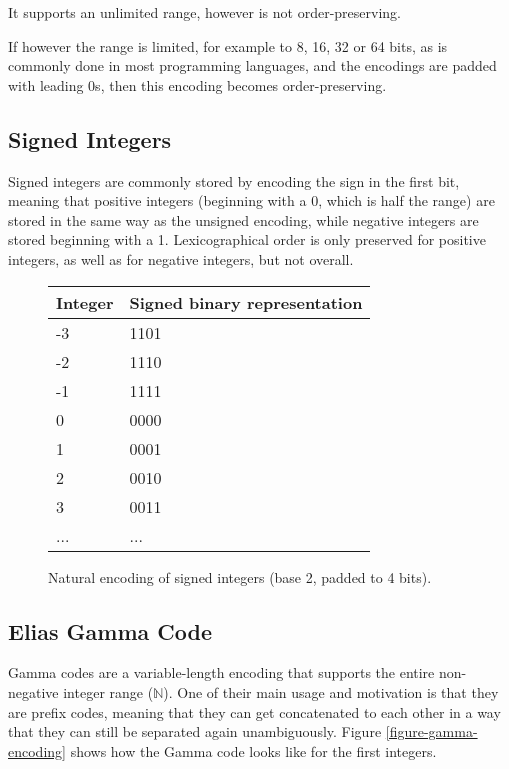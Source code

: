 \documentclass{acm_proc_article-sp}
\begin{document}
It supports an unlimited range, however is not order-preser\-ving.

If however the range is limited, for example to 8, 16, 32 or 64 bits, as is commonly done in most programming languages, and the encodings are padded with leading 0s, then this encoding becomes order-preserving.

\subsection{Signed Integers}

Signed integers are commonly stored by encoding the sign in the first bit, meaning that positive integers (beginning with a 0, which is half the range) are stored in the same way as the unsigned encoding, while negative integers are stored beginning with a 1. Lexicographical order is only preserved for positive integers, as well as for negative integers, but not overall.

\begin{figure}
\caption{Natural encoding of signed integers (base 2, padded to 4 bits).}
\label{figure-natural-signed-encoding}
\center
\begin{tabular}{|l|l|}
\hline
Integer & Signed binary representation \\
\hline
-3 & 1101 \\
\hline
-2 & 1110 \\
\hline
-1 & 1111 \\
\hline
0 & 0000 \\
\hline
1 & 0001 \\
\hline
2 & 0010 \\
\hline
3 & 0011 \\
\hline
... & ... \\
\hline
\end{tabular}
\end{figure}

\subsection{Elias Gamma Code}
\label{section-gamma-code}

Gamma codes are a variable-length encoding that supports the entire non-negative integer range ($\mathbb{N}$). One of their main usage and motivation is that they are prefix codes, meaning that they can get concatenated to each other in a way that they can still be separated again unambiguously. Figure \ref{figure-gamma-encoding} shows how the Gamma code looks like for the first integers.
\end{document}
